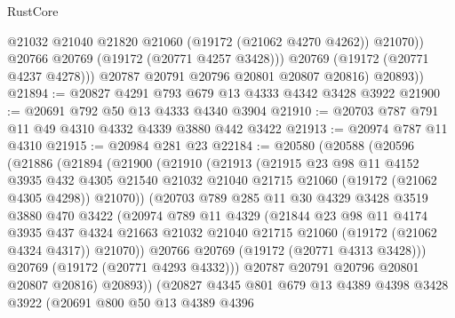\begin{lexlean}{RustCore}
\begin{coremodule}
                  @21032
                  @21040
                  @21820
                  @21060
                  (@19172 (@21062 @4270 @4262))
                  @21070))
              @20766
              @20769
              (@19172 (@20771 @4257 @3428)))
            @20769
            (@19172 (@20771 @4237 @4278)))
          @20787
          @20791
          @20796
          @20801
          @20807
          @20816)
        @20893))
@21894 := @20827 @4291 @793 @679 @13 @4333 @4342 @3428 @3922
@21900 := @20691 @792 @50 @13 @4333 @4340 @3904
@21910 := @20703 @787 @791 @11 @49 @4310 @4332 @4339 @3880 @442 @3422
@21913 := @20974 @787 @11 @4310
@21915 := @20984 @281 @23
@22184 := @20580
    (@20588
      (@20596
        (@21886
          (@21894
            (@21900
              (@21910
                (@21913
                  (@21915
                    @23
                    @98
                    @11
                    @4152
                    @3935
                    @432
                    @4305
                    @21540
                    @21032
                    @21040
                    @21715
                    @21060
                    (@19172 (@21062 @4305 @4298))
                    @21070))
                (@20703
                  @789
                  @285
                  @11
                  @30
                  @4329
                  @3428
                  @3519
                  @3880
                  @470
                  @3422
                  (@20974
                    @789
                    @11
                    @4329
                    (@21844
                      @23
                      @98
                      @11
                      @4174
                      @3935
                      @437
                      @4324
                      @21663
                      @21032
                      @21040
                      @21715
                      @21060
                      (@19172 (@21062 @4324 @4317))
                      @21070))
                  @20766
                  @20769
                  (@19172 (@20771 @4313 @3428)))
                @20769
                (@19172 (@20771 @4293 @4332)))
              @20787
              @20791
              @20796
              @20801
              @20807
              @20816)
            @20893))
        (@20827
          @4345
          @801
          @679
          @13
          @4389
          @4398
          @3428
          @3922
          (@20691
            @800
            @50
            @13
            @4389
            @4396

\end{coremodule}
\end{lexlean}
